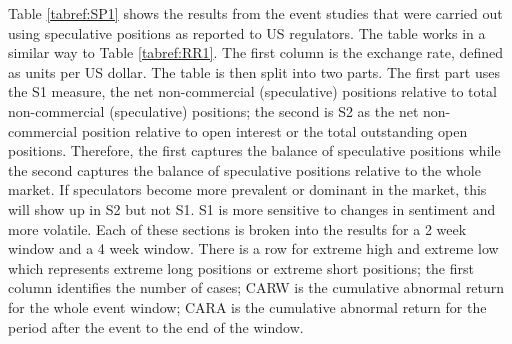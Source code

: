 \documentclass{article}
\begin{document}
Table \ref{tabref:SP1} shows the results from the event studies that were carried out using speculative positions as reported to US regulators.  The table works in a similar way to Table \ref{tabref:RR1}.  The first column is the exchange rate, defined as units per US dollar.  The table is then split into two parts.  The first part uses the S1 measure, the net non-commercial (speculative) positions relative to total non-commercial (speculative) positions; the second is S2 as the net non-commercial position relative to open interest or the total outstanding open positions.  Therefore, the first captures the balance of speculative positions while the second captures the balance of speculative positions relative to the whole market.  If speculators become more prevalent or dominant in the market, this will show up in S2 but not S1.  S1 is more sensitive to changes in sentiment and more volatile. Each of these sections is broken into the results for a 2 week window and a 4 week window.  There is a row for extreme high and extreme low which represents extreme long positions or extreme short positions; the first  column identifies the number of cases; CARW is the cumulative abnormal return for the whole event window; CARA is the cumulative abnormal return for the period after the event to the end of the window.     
\end{document}
